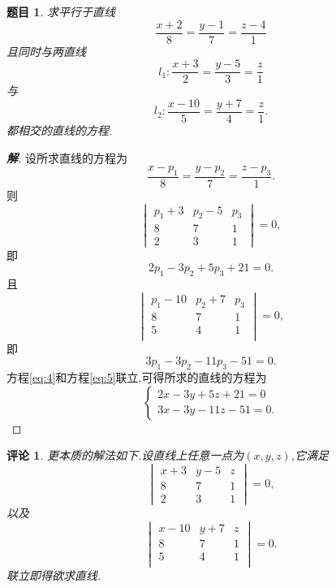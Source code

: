 \documentclass[a4paper]{article}
\newtheorem*{exe}{题目}
\newtheorem*{rem}{评论}
\newenvironment{exercise}
{\bigskip\begin{mdframed}\begin{exe}}
    {\end{exe}\end{mdframed}\bigskip}
\newenvironment{remark}
{\bigskip\begin{mdframed}\begin{rem}}
    {\end{rem}\end{mdframed}\bigskip}
\begin{document}
\begin{exercise}
求平行于直线
\begin{equation}\label{eq:1}\frac{x+2}{8}=\frac{y-1}{7}=\frac{z-4}{1}\end{equation}
且同时与两直线
\begin{equation}
  \label{eq:2}
  l_1:\frac{x+3}{2}=\frac{y-5}{3}=\frac{z}{1}
\end{equation}
与
\begin{equation}
  \label{eq:3}
  l_2:\frac{x-10}{5}=\frac{y+7}{4}=\frac{z}{1}.
\end{equation}
都相交的直线的方程.
\end{exercise}
\begin{proof}[\textbf{解}]
设所求直线的方程为
$$
\frac{x-p_1}{8}=\frac{y-p_2}{7}=\frac{z-p_3}{1}.
$$
则
$$
\begin{vmatrix}
  p_1+3&p_2-5&p_3\\
8&7&1\\
2&3&1
\end{vmatrix}=0,
$$
即
\begin{equation}
  \label{eq:4}
  2p_1-3p_2+5p_3+21=0.
\end{equation}
且
$$
\begin{vmatrix}
  p_1-10&p_2+7&p_3\\
8&7&1\\
5&4&1\\
\end{vmatrix}=0,
$$
即
\begin{equation}
  \label{eq:5}
  3p_1-3p_2-11p_3-51=0.
\end{equation}
方程\eqref{eq:4}和方程\eqref{eq:5}联立,可得所求的直线的方程为
$$
\begin{cases}
  2x-3y+5z+21=0\\
3x-3y-11z-51=0.
\end{cases}
$$
\end{proof}
\begin{remark}
更本质的解法如下.设直线上任意一点为$(x,y,z)$,它满足
$$
\begin{vmatrix}
  x+3&y-5&z\\
8&7&1\\
2&3&1
\end{vmatrix}=0,
$$
以及
$$
\begin{vmatrix}
  x-10&y+7&z\\
8&7&1\\
5&4&1\\
\end{vmatrix}=0.
$$
联立即得欲求直线.
\end{remark}
\end{document}
